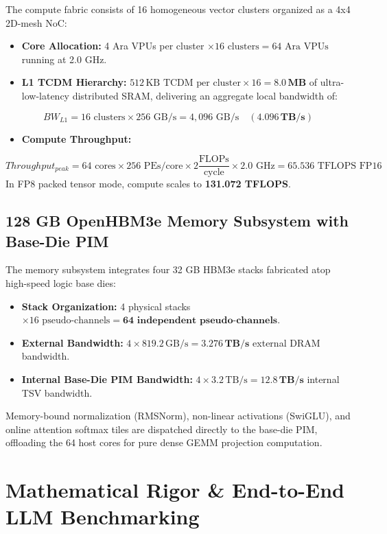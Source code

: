 \documentclass[journal,10pt,twocolumn]{IEEEtran}
\begin{document}
The compute fabric consists of 16 homogeneous vector clusters organized as a 4x4 2D-mesh NoC:
\begin{itemize}
  \item \textbf{Core Allocation:} 4 Ara VPUs per cluster $\times 16\text{ clusters} = 64\text{ Ara VPUs}$ running at 2.0 GHz.
  \item \textbf{L1 TCDM Hierarchy:} $512\,\text{KB TCDM per cluster} \times 16 = \mathbf{8.0\,\text{MB}}$ of ultra-low-latency distributed SRAM, delivering an aggregate local bandwidth of:
\end{itemize}
$$BW_{L1} = 16 \text{ clusters} \times 256 \text{ GB/s} = 4,096 \text{ GB/s} \quad (\mathbf{4.096\,\text{TB/s}})$$
\begin{itemize}
  \item \textbf{Compute Throughput:}
\end{itemize}
$$Throughput_{peak} = 64 \text{ cores} \times 256 \text{ PEs/core} \times 2 \frac{\text{FLOPs}}{\text{cycle}} \times 2.0 \text{ GHz} = 65.536 \text{ TFLOPS FP16}$$
In FP8 packed tensor mode, compute scales to \textbf{131.072 TFLOPS}.

\subsection{128 GB OpenHBM3e Memory Subsystem with Base-Die PIM}

The memory subsystem integrates four 32 GB HBM3e stacks fabricated atop high-speed logic base dies:
\begin{itemize}
  \item \textbf{Stack Organization:} 4 physical stacks $\times 16\text{ pseudo-channels} = \mathbf{64\text{ independent pseudo-channels}}$.
  \item \textbf{External Bandwidth:} $4 \times 819.2\,\text{GB/s} = \mathbf{3.276\,\text{TB/s}}$ external DRAM bandwidth.
  \item \textbf{Internal Base-Die PIM Bandwidth:} $4 \times 3.2\,\text{TB/s} = \mathbf{12.8\,\text{TB/s}}$ internal TSV bandwidth.
\end{itemize}

Memory-bound normalization (RMSNorm), non-linear activations (SwiGLU), and online attention softmax tiles are dispatched directly to the base-die PIM, offloading the 64 host cores for pure dense GEMM projection computation.


\section{Mathematical Rigor \& End-to-End LLM Benchmarking}
\end{document}
